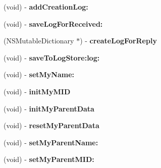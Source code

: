 \begin{DoxyCompactItemize}
\item 
\hypertarget{interface_messenger_system_aa4f4f9dbed2ccb22b30fa3bc86229560}{
(void) -\/ {\bfseries addCreationLog:}}
\label{interface_messenger_system_aa4f4f9dbed2ccb22b30fa3bc86229560}

\item 
\hypertarget{interface_messenger_system_aea64a6b2e2486edb5a3443a23d13934f}{
(void) -\/ {\bfseries saveLogForReceived:}}
\label{interface_messenger_system_aea64a6b2e2486edb5a3443a23d13934f}

\item 
\hypertarget{interface_messenger_system_a51d6be48e11ee01ba98c720b46ae398e}{
(NSMutableDictionary $\ast$) -\/ {\bfseries createLogForReply}}
\label{interface_messenger_system_a51d6be48e11ee01ba98c720b46ae398e}

\item 
\hypertarget{interface_messenger_system_a04b3995de0fb3486ee1f64bc8868b8f3}{
(void) -\/ {\bfseries saveToLogStore:log:}}
\label{interface_messenger_system_a04b3995de0fb3486ee1f64bc8868b8f3}

\item 
\hypertarget{interface_messenger_system_a0388f0bc3b5d73f8404fb65ae9f2478d}{
(void) -\/ {\bfseries setMyName:}}
\label{interface_messenger_system_a0388f0bc3b5d73f8404fb65ae9f2478d}

\item 
\hypertarget{interface_messenger_system_adac10123acd489108d70a63d1b42669c}{
(void) -\/ {\bfseries initMyMID}}
\label{interface_messenger_system_adac10123acd489108d70a63d1b42669c}

\item 
\hypertarget{interface_messenger_system_ae32a19a0477498f6b079551dfa08a15e}{
(void) -\/ {\bfseries initMyParentData}}
\label{interface_messenger_system_ae32a19a0477498f6b079551dfa08a15e}

\item 
\hypertarget{interface_messenger_system_a111b446c0453facea8fc35774323dae7}{
(void) -\/ {\bfseries resetMyParentData}}
\label{interface_messenger_system_a111b446c0453facea8fc35774323dae7}

\item 
\hypertarget{interface_messenger_system_a77cb388881cfe26e1b6440a1409c7c23}{
(void) -\/ {\bfseries setMyParentName:}}
\label{interface_messenger_system_a77cb388881cfe26e1b6440a1409c7c23}

\item 
\hypertarget{interface_messenger_system_a4b835de059160b6e22eadd4035769c04}{
(void) -\/ {\bfseries setMyParentMID:}}
\label{interface_messenger_system_a4b835de059160b6e22eadd4035769c04}

\end{DoxyCompactItemize}

